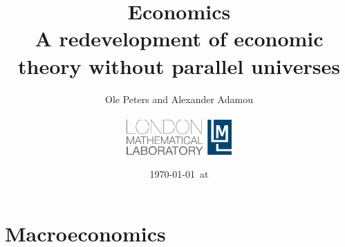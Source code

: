 


\title{Economics\\
\large{A redevelopment of economic theory without parallel universes}}
\author{Ole Peters and Alexander Adamou\\
\vspace{10cm}\\
\includegraphics[width=0.3\textwidth]{./lml_LOGO_whiteBG-eps-converted-to.pdf}}


\date{\today ~at \currenttime }

\maketitle

\tableofcontents
\newpage

%
%
%
%
%
\part{Macroeconomics}




\FloatBarrier
\printnoidxglossaries




